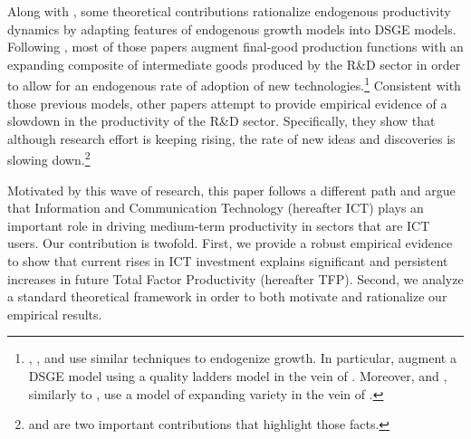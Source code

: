 \documentclass[14pt]{article}
\begin{document}
Along with \cite{comin2006medium}, some theoretical contributions rationalize endogenous productivity dynamics by adapting features of endogenous growth models into DSGE models. Following \cite{romer1990endogenous}, most of those papers augment final-good production functions with an expanding composite of intermediate goods produced by the R\&D sector in order to allow for an endogenous rate of adoption of new technologies.\footnote{\cite{bianchi2014growth}, \cite{anzoategui2016endogenous}, and \cite{moran2017innovation} use similar techniques to endogenize growth. In particular, \cite{bianchi2014growth} augment a DSGE  model using a quality ladders model in the vein of \cite{grossman1991quality}. Moreover, \cite{anzoategui2016endogenous} and \cite{moran2017innovation}, similarly to \cite{comin2006medium}, use a model of expanding variety in the vein of \cite{romer1990endogenous}.} Consistent with those previous models, other papers attempt to provide empirical evidence of a slowdown in the productivity of the R\&D sector. Specifically, they show that although research effort is keeping rising, the rate of new ideas and discoveries is slowing down.\footnote{\cite{jones2009burden} and \cite{bloom2017ideas} are two important contributions that highlight those facts.}

Motivated by this wave of research, this paper follows a different path and argue that Information and Communication Technology (hereafter ICT) plays an important role in driving medium-term productivity in sectors that are ICT users. Our contribution is twofold. First, we provide a robust empirical evidence to show that current rises in ICT investment explains significant and persistent increases in future Total Factor Productivity (hereafter TFP). Second, we analyze a standard theoretical framework in order to both motivate and rationalize our empirical results. 
\end{document}
